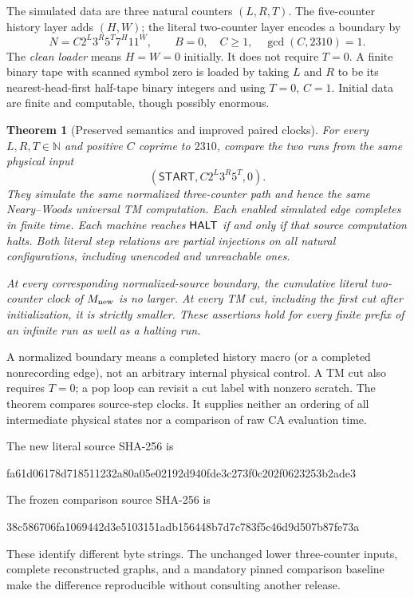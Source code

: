 \documentclass[11pt,a4paper]{article}
\numberwithin{equation}{section}
\newtheorem{theorem}{Theorem}[section]
\newcommand{\N}{\mathbb N}\newcommand{\Z}{\mathbb Z}\newcommand{\R}{\mathbb R}
\newcommand{\START}{\mathsf{START}}
\begin{document}
The simulated data are three natural counters $(L,R,T)$. The five-counter
history layer adds $(H,W)$; the literal two-counter layer encodes a boundary by
\begin{equation}
 N=C2^L3^R5^T7^H11^W,\qquad B=0,
 \quad C\geq1,\quad \gcd(C,2310)=1.
 \label{fpa:st:eq:encoding}
\end{equation}
The \emph{clean loader} means $H=W=0$ initially. It does not require $T=0$.
A finite binary tape with scanned symbol zero is loaded by taking $L$ and
$R$ to be its nearest-head-first half-tape binary integers and using $T=0$,
$C=1$. Initial data are finite and computable, though possibly enormous.

\begin{theorem}[Preserved semantics and improved paired clocks]
\label{fpa:st:thm:main}
For every $L,R,T\in\N$ and positive $C$ coprime to $2310$, compare the two
runs from the same physical input
\[
 (\START,C2^L3^R5^T,0).
\]
They simulate the same normalized three-counter path and hence the same
Neary--Woods universal TM computation. Each enabled simulated edge completes
in finite time. Each machine reaches $\mathsf{HALT}$ if and only if that source
computation halts. Both literal step relations are partial injections on
\emph{all} natural configurations, including unencoded and unreachable ones.

At every corresponding normalized-source boundary, the cumulative literal
two-counter clock of $M_{\rm new}$ is no larger. At every TM cut, including
the first cut after initialization, it is strictly smaller. These assertions
hold for every finite prefix of an infinite run as well as a halting run.
\end{theorem}

A normalized boundary means a completed history macro (or a completed
nonrecording edge), not an arbitrary internal physical control. A TM cut
also requires $T=0$; a pop loop can revisit a cut label with nonzero scratch.
The theorem compares source-step clocks. It supplies neither an ordering of
all intermediate physical states nor a comparison of raw CA evaluation time.

The new literal source SHA-256 is
\begin{center}\small\ttfamily
fa61d06178d718511232a80a05e02192d940fde3c273f0c202f0623253b2ade3
\end{center}
The frozen comparison source SHA-256 is
\begin{center}\small\ttfamily
38c586706fa1069442d3e5103151adb156448b7d7c783f5c46d9d507b87fe73a
\end{center}
These identify different byte strings. The unchanged lower three-counter
inputs, complete reconstructed graphs, and a mandatory pinned comparison
baseline make the difference reproducible without consulting another release.
\end{document}
